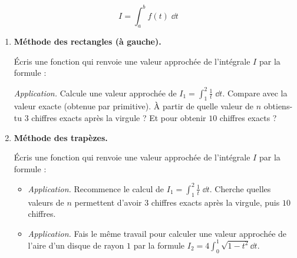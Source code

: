 \documentclass[11pt,class=report,crop=false]{standalone}
\begin{document}

\begin{activite}


$$I = \int_a^b f(t) \;\dd t$$

\begin{enumerate}
  \item \textbf{Méthode des rectangles (à gauche).}
  
  \'Ecris une fonction  qui renvoie une valeur approchée de l'intégrale $I$ par la formule :
  
  
  \emph{Application.} Calcule une valeur approchée de $I_1 = \int_{1}^{2} \frac 1t \; \dd t$. Compare avec la valeur exacte (obtenue par primitive). \`A partir de quelle valeur de $n$ obtiens-tu $3$ chiffres exacts après la virgule ? Et pour obtenir $10$ chiffres exacts ?
  
    
  \item  \textbf{Méthode des trapèzes.}
  
  \'Ecris une fonction  qui renvoie une valeur approchée de l'intégrale $I$ par la formule :

  \begin{itemize}
  \item \emph{Application.} Recommence le calcul de $I_1 = \int_{1}^{2} \frac 1t \; \dd t$. Cherche quelles valeurs de $n$ permettent d'avoir $3$ chiffres exacts après la virgule, puis $10$ chiffres.
  
  \item 
  \begin{minipage}[t]{0.60\textwidth}   
  \emph{Application.} Fais le même travail pour calculer une valeur approchée de l'aire d'un disque de rayon $1$ par la formule $I_2 = 4 \int_0^1 \sqrt{1-t^2}\dd t$. 
  \end{minipage}\qquad
  \begin{minipage}[]{0.25\textwidth}      
 \end{minipage} 
  

\end{itemize}
\end{enumerate}
\end{activite}
\end{document}
